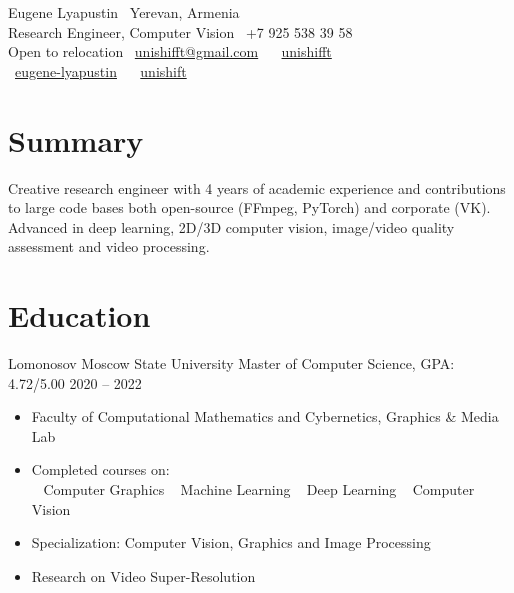 \documentclass{tccv}
\newcommand{\sphere}{360\textdegree~}
\begin{document}
{ Eugene Lyapustin} \hfill \faMapMarker~Yerevan, Armenia \\
{\Large Research Engineer, Computer Vision} \hfill \faPhone~+7 925 538 39 58 \\
Open to relocation \hfill \faEnvelope~\href{mailto:unishifft@gmail.com}{unishifft@gmail.com} ~ \faTelegramPlane~\href{https://t.me/unishifft}{unishifft}\\
\null\hfill \faLinkedin~\href{https://linkedin.com/in/eugene-lyapustin}{eugene-lyapustin} ~ \faGithub~\href{https://github.com/unishift/}{unishift}


\section{Summary}

Creative research engineer with 4 years of academic experience and contributions to large code bases both open-source (FFmpeg, PyTorch) and corporate (VK). Advanced in deep learning, 2D/3D computer vision, image/video quality assessment and video processing.

\section{Education}

\begin{eventlist}

\evententry{}
     {Lomonosov Moscow State University}
     {Master of Computer Science, GPA: 4.72/5.00}
     {2020 -- 2022}
\begin{itemize}
     \item Faculty of Computational Mathematics and Cybernetics, Graphics \& Media Lab
     \item Completed courses on:\\
          \faAngleRight~ Computer Graphics\qquad
          \faAngleRight~ Machine Learning\qquad
          \faAngleRight~ Deep Learning\qquad
          \faAngleRight~ Computer Vision
     \item Specialization: Computer Vision, Graphics and Image Processing
     \item Research on Video Super-Resolution
\end{itemize}


\end{eventlist}
\end{document}
